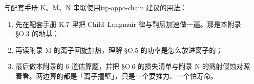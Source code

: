 \begin{tip}{与配套手册 K、M、N 串联使用}{tip-appo-chain}
建议的用法：
\begin{enumerate}[nosep,leftmargin=1.6em]
  \item 先在配套手册 K.7 里把 Child--Langmuir 律与鞘层加速做一遍。那是本附录 \S O.3 的地基；
  \item 再读附录 M 的离子回旋加热，理解 \S O.5 的功率是怎么放进离子的；
  \item 最后做本附录的 6 道估算题，并把 \S O.6 的损失清单与附录 N 的溅射侵蚀对照着看。两边算的都是「离子撞壁」，只是一个要推力、一个怕寿命。
\end{enumerate}
\end{tip}
\endgroup
